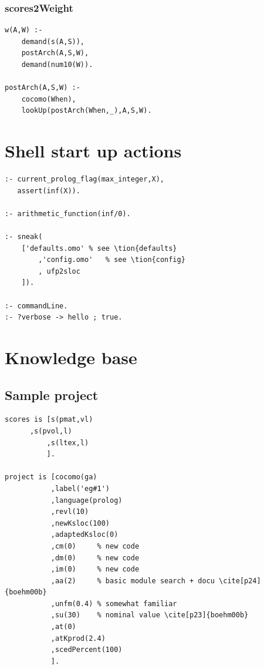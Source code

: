 \documentclass[twocolumn,global]{svjour}
\begin{document}
\subsubsection{ scores2Weight }\begin{Verbatim}
w(A,W) :-
    demand(s(A,S)),
    postArch(A,S,W),
    demand(num10(W)).

postArch(A,S,W) :-
    cocomo(When),
    lookUp(postArch(When,_),A,S,W).
\end{Verbatim}
\section{ Shell start up actions }\begin{Verbatim}
:- current_prolog_flag(max_integer,X),
   assert(inf(X)).

:- arithmetic_function(inf/0).

:- sneak(
    ['defaults.omo' % see \tion{defaults}
        ,'config.omo'   % see \tion{config}
        , ufp2sloc
    ]).

:- commandLine.
:- ?verbose -> hello ; true.
\end{Verbatim}
\section{ Knowledge base
}
\subsection{ Sample project }\begin{Verbatim}
scores is [s(pmat,vl)
      ,s(pvol,l)
          ,s(ltex,l)
          ].

project is [cocomo(ga)
           ,label('eg#1')
           ,language(prolog)
           ,revl(10)
           ,newKsloc(100)
           ,adaptedKsloc(0)
           ,cm(0)     % new code
           ,dm(0)     % new code
           ,im(0)     % new code
           ,aa(2)     % basic module search + docu \cite[p24]{boehm00b}
           ,unfm(0.4) % somewhat familiar
           ,su(30)    % nominal value \cite[p23]{boehm00b}
           ,at(0)
           ,atKprod(2.4)
           ,scedPercent(100)
           ].
\end{Verbatim}
\end{document}
